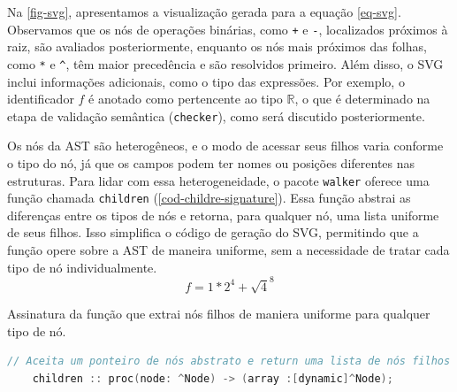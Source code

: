Na \autoref{fig-svg}, apresentamos a visualização gerada para a equação \autoref{eq-svg}. Observamos que os nós de operações binárias, como \texttt{+} e \texttt{-}, localizados próximos à raiz, são avaliados posteriormente, enquanto os nós mais próximos das folhas, como \texttt{*} e \texttt{\^}, têm maior precedência e são resolvidos primeiro. Além disso, o SVG inclui informações adicionais, como o tipo das expressões. Por exemplo, o identificador \( f \) é anotado como pertencente ao tipo \( \mathbb{R} \), o que é determinado na etapa de validação semântica (\texttt{checker}), como será discutido posteriormente.

Os nós da AST são heterogêneos, e o modo de acessar seus filhos varia conforme o tipo do nó, já que os campos podem ter nomes ou posições diferentes nas estruturas. Para lidar com essa heterogeneidade, o pacote \texttt{walker} oferece uma função chamada \texttt{children} (\autoref{cod-childre-signature}). Essa função abstrai as diferenças entre os tipos de nós e retorna, para qualquer nó, uma lista uniforme de seus filhos. Isso simplifica o código de geração do SVG, permitindo que a função opere sobre a AST de maneira uniforme, sem a necessidade de tratar cada tipo de nó individualmente.
\begin{equation} \label{eq-svg}
   f =  1*2 ^ 4 +  \sqrt 4^8
\end{equation}


\begin{codigo}[!h]
        \caption{\small Assinatura da função que extrai nós filhos de maniera uniforme para qualquer tipo de nó. }
        \label{cod-childre-signature}
  \begin{lstlisting}[language = C]
    // Aceita um ponteiro de nós abstrato e return uma lista de nós filhos
    children :: proc(node: ^Node) -> (array :[dynamic]^Node);
  \end{lstlisting}
\end{codigo}


